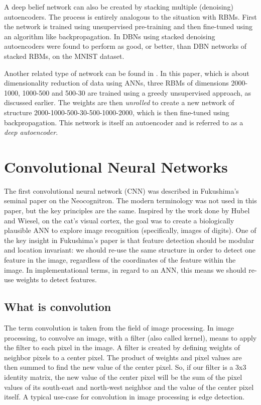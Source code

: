 \documentclass[11pt]{article}
\begin{document}
A deep belief network can also be created by stacking multiple (denoising) autoencoders.  The process is entirely analogous to the situation with RBMs.  First the network is trained using unsupervised pre-training and then fine-tuned using an algorithm like backpropagation.  In \cite{bengio07} DBNs using stacked denoising autoencoders were found to perform as good, or better, than DBN networks of stacked RBMs, on the MNIST dataset.

Another related type of network can be found in \cite{hinton06reducing}.  In this paper, which is about dimensionality reduction of data using ANNs, three RBMs of dimensions 2000-1000, 1000-500 and 500-30 are trained using a greedy unsupervised approach, as discussed earlier.  The weights are then \textit{unrolled} to create a new network of structure 2000-1000-500-30-500-1000-2000, which is then fine-tuned using backpropagation.  This network is itself an autoencoder and is referred to as a \textit{deep autoencoder}.

\section{Convolutional Neural Networks}

The first convolutional neural network (CNN) was described in Fukushima's seminal paper on the Neocognitron\cite{fukushima}.  The modern terminology was not used in this paper, but the key principles are the same.  Inspired by the work done by Hubel and Wiesel, on the cat's visual cortex\cite{hubel}, the goal was to create a biologically plausible ANN to explore image recognition (specifically, images of digits).  One of the key insight in Fukushima's paper is that feature detection should be modular and location invariant: we should re-use the same structure in order to detect one feature in the image, regardless of the coordinates of the feature within the image.  In implementational terms, in regard to an ANN, this means we should re-use weights to detect features.

\subsection{What is convolution}

The term convolution is taken from the field of image processing.  In image processing, to convolve an image, with a filter (also called kernel), means to apply the filter to each pixel in the image.  A filter is created by defining weights of neighbor pixels to a center pixel.  The product of weights and pixel values are then summed to find the new value of the center pixel.  So, if our filter is a 3x3 identity matrix, the new value of the center pixel will be the sum of the pixel values of its south-east and north-west neighbor and the value of the center pixel itself.  A typical use-case for convolution in image processing is edge detection.
\end{document}
